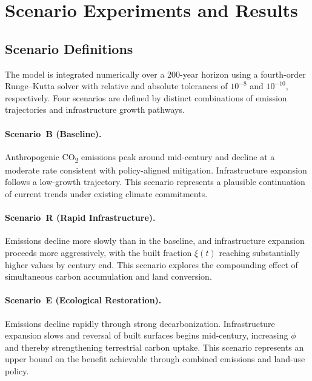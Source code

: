 \documentclass[12pt]{article}
\begin{document}
\section{Scenario Experiments and Results}
\label{sec:scenarios}

\subsection{Scenario Definitions}

The model is integrated numerically over a 200-year horizon using a fourth-order
Runge--Kutta solver with relative and absolute tolerances of $10^{-8}$ and
$10^{-10}$, respectively.  Four scenarios are defined by distinct combinations
of emission trajectories and infrastructure growth pathways.

\paragraph{Scenario~B (Baseline).}
Anthropogenic CO\textsubscript{2} emissions peak around mid-century and decline
at a moderate rate consistent with policy-aligned mitigation.  Infrastructure
expansion follows a low-growth trajectory.  This scenario represents a plausible
continuation of current trends under existing climate commitments.

\paragraph{Scenario~R (Rapid Infrastructure).}
Emissions decline more slowly than in the baseline, and infrastructure expansion
proceeds more aggressively, with the built fraction $\xi(t)$ reaching
substantially higher values by century end.  This scenario explores the
compounding effect of simultaneous carbon accumulation and land conversion.

\paragraph{Scenario~E (Ecological Restoration).}
Emissions decline rapidly through strong decarbonization.  Infrastructure
expansion slows and reversal of built surfaces begins mid-century, increasing
$\phi$ and thereby strengthening terrestrial carbon uptake.  This scenario
represents an upper bound on the benefit achievable through combined emissions
and land-use policy.
\end{document}
